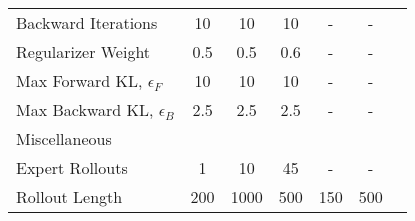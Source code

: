 \begin{table}[th]
\begin{center}
\begin{small}
\begin{sc}
\begin{tabular}{lcccccr}
\;\;\;\;Backward Iterations             & 10   & 10   & 10    & - & -\\
\;\;\;\;Regularizer Weight              & 0.5  & 0.5  & 0.6   & - & -\\
\;\;\;\;Max Forward KL, $\epsilon_F$    & 10   & 10   & 10    & - & -\\
\;\;\;\;Max Backward KL, $\epsilon_B$   & 2.5  & 2.5  & 2.5   & - & -\\
Miscellaneous\\
\;\;\;\;Expert Rollouts                 & 1    & 10   & 45    & -   & -\\
\;\;\;\;Rollout Length                  & 200  & 1000 & 500   & 150 & 500\\
\bottomrule
\end{tabular}
\end{sc}
\end{small}
\end{center}
\vskip -0.1in
\end{table}